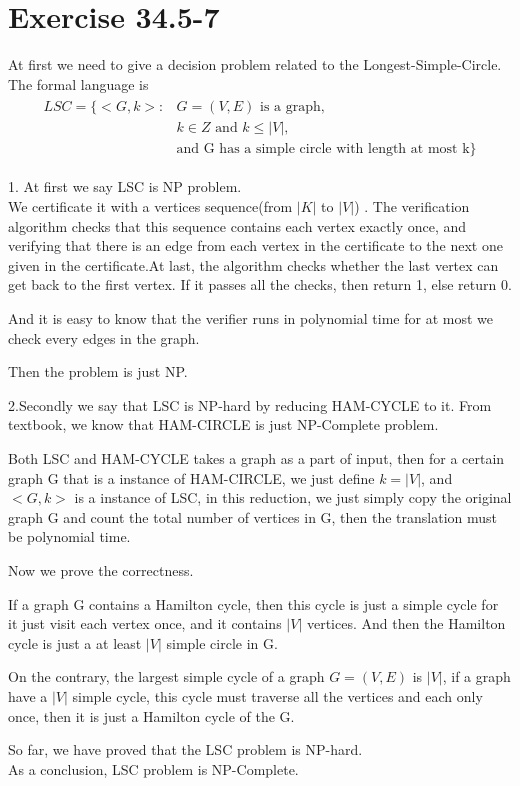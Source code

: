 \documentclass[oneside]{homework} %
\begin{document}
\maketitle
\newpage
\section{Exercise 34.5-7}
At first we need to give a decision problem related to the Longest-Simple-Circle.\\ The formal language is \\
\begin{eqnarray*}
  \begin{split}
LSC = \{ <G,k> : &G = (V,E) \text{ is a graph, } \\ & k \in Z \text{ and } k\leq|V|, \\ & \text{and G has a simple circle with length at most k}\}
  \end{split}
\end{eqnarray*}

1. At first we say LSC is NP problem.\\ 
We certificate it with a vertices sequence(from $|K|$ to $|V|$) . The verification algorithm checks that this sequence contains each vertex exactly once, and verifying that there is an edge from each vertex in the certificate to the next one given in the certificate.At last, the algorithm checks whether the last vertex can get back to the first vertex. If it passes all the checks, then return 1, else return 0.

And it is easy to know that the verifier runs in polynomial time for at most we check every edges in the graph.

Then the problem is just NP.

2.Secondly we say that LSC is NP-hard by reducing HAM-CYCLE to it.
From textbook, we know that HAM-CIRCLE is just NP-Complete problem.

Both LSC and HAM-CYCLE takes a graph as a part of input, then for a certain graph G that is a instance of HAM-CIRCLE, we just define $k = |V|$, and $<G,k>$ is a instance of LSC, in this reduction, we just simply copy the original graph G and count the total number of vertices in G, then the translation must be polynomial time.

Now we prove the correctness.

If a graph G contains a Hamilton cycle, then this cycle is just a simple cycle for it just visit each vertex once, and it contains $|V|$ vertices. And then the Hamilton cycle is just a at least $|V|$ simple circle in G.

On the contrary, the largest simple cycle of a graph $G = (V,E)$ is $|V|$, if a graph have a $|V|$ simple cycle, this cycle must traverse all the vertices and each only once, then it is just a Hamilton cycle of the G.

So far, we have proved that the LSC problem is NP-hard. \\ 

As a conclusion, LSC problem is NP-Complete.
\end{document}

